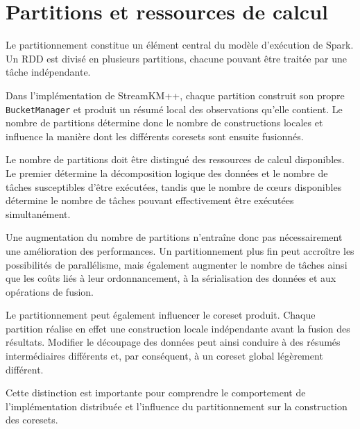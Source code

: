 \section{Partitions et ressources de calcul}
\label{sec:spark-partitions-coeurs}

Le partitionnement constitue un élément central du modèle d'exécution de Spark. Un RDD est divisé en plusieurs partitions, chacune pouvant être traitée par une tâche indépendante.

Dans l'implémentation de StreamKM++, chaque partition construit son propre \texttt{BucketManager} et produit un résumé local des observations qu'elle contient. Le nombre de partitions détermine donc le nombre de constructions locales et influence la manière dont les différents coresets sont ensuite fusionnés.

Le nombre de partitions doit être distingué des ressources de calcul disponibles. Le premier détermine la décomposition logique des données et le nombre de tâches susceptibles d'être exécutées, tandis que le nombre de c\oe{}urs disponibles détermine le nombre de tâches pouvant effectivement être exécutées simultanément.

Une augmentation du nombre de partitions n'entraîne donc pas nécessairement une amélioration des performances. Un partitionnement plus fin peut accroître les possibilités de parallélisme, mais également augmenter le nombre de tâches ainsi que les coûts liés à leur ordonnancement, à la sérialisation des données et aux opérations de fusion.

Le partitionnement peut également influencer le coreset produit. Chaque partition réalise en effet une construction locale indépendante avant la fusion des résultats. Modifier le découpage des données peut ainsi conduire à des résumés intermédiaires différents et, par conséquent, à un coreset global légèrement différent.

Cette distinction est importante pour comprendre le comportement de l'implémentation distribuée et l'influence du partitionnement sur la construction des coresets.

